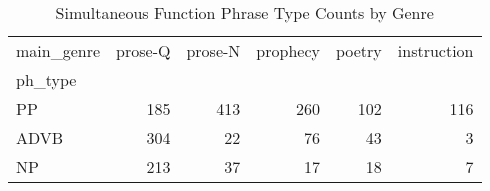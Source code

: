 \begin{table}[htbp!]
\centering
\caption{Simultaneous Function Phrase Type Counts by Genre}
\label{table:simgenph_ct}
\begin{tabular}{lrrrrr}
\toprule
main\_genre &  prose-Q &  prose-N &  prophecy &  poetry &  instruction \\
ph\_type &          &          &           &         &              \\
\midrule
PP      &      185 &      413 &       260 &     102 &          116 \\
ADVB    &      304 &       22 &        76 &      43 &            3 \\
NP      &      213 &       37 &        17 &      18 &            7 \\
\bottomrule
\end{tabular}
\end{table}
